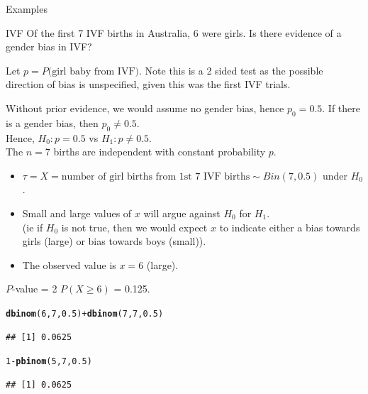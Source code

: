 \documentclass[t,xcolor=pdftex,dvipsnames,table]{beamer}
\makeatletter
\newcommand{\hlnum}[1]{\textcolor[rgb]{0.686,0.059,0.569}{#1}}%
\newcommand{\hlopt}[1]{\textcolor[rgb]{0,0,0}{#1}}%
\newcommand{\hlstd}[1]{\textcolor[rgb]{0.345,0.345,0.345}{#1}}%
\newcommand{\hlkwd}[1]{\textcolor[rgb]{0.737,0.353,0.396}{\textbf{#1}}}%
\newenvironment{kframe}{%
 \def\at@end@of@kframe{}%
 \ifinner\ifhmode%
  \def\at@end@of@kframe{\end{minipage}}%
  \begin{minipage}{\columnwidth}%
 \fi\fi%
 \def\FrameCommand##1{\hskip\@totalleftmargin \hskip-\fboxsep
 \colorbox{shadecolor}{##1}\hskip-\fboxsep
     \hskip-\linewidth \hskip-\@totalleftmargin \hskip\columnwidth}%
 \MakeFramed {\advance\hsize-\width
   \@totalleftmargin\z@ \linewidth\hsize
   \@setminipage}}%
 {\par\unskip\endMakeFramed%
 \at@end@of@kframe}
\newenvironment{knitrout}{}{} %
\makeatother
\begin{document}
\begin{frame}{Examples}
\begin{block}{IVF}
Of the first 7 IVF births in Australia, 6 were girls. Is there evidence of a gender bias in IVF?
\end{block}

\vspace{.5cm}
Let $p = P(\mbox{girl baby from IVF)}$. Note this is a 2 sided test as the possible direction of bias is unspecified, given this was the first IVF trials.

\vspace{.5cm}
Without prior evidence, we would assume no gender bias, hence $p_{0} = 0.5$. If there is a gender bias, then $p_{0} \neq 0.5$.  \\
Hence,  $H_{0}: p = 0.5$ vs $H_{1}: p \neq 0.5$. \\

\vspace{.5cm}
 The $n=7$ births are independent with constant probability $p$.

\end{frame}


\begin{frame}[fragile]{}

\begin{itemize}
\item $\tau = X =  \mbox{number of girl births from 1st 7 IVF births} \sim Bin(7,0.5)$ under $H_{0}$. 
\item Small and large values of $x$ will argue against $H_{0}$ for $H_{1}$. \\
(ie if $H_{0}$ is not true, then we would expect $x$ to indicate either a bias towards girls (large) or bias towards boys (small)).
\item The observed value is $x=6$ (large).
\end{itemize}

\vspace{.5cm}
 $P$-value = 2 $P( X \geq 6)$ = 0.125.

\begin{knitrout}
\color{fgcolor}\begin{kframe}
\begin{alltt}
\hlkwd{dbinom}\hlstd{(}\hlnum{6}\hlstd{,}\hlnum{7}\hlstd{,}\hlnum{0.5}\hlstd{)} \hlopt{+} \hlkwd{dbinom}\hlstd{(}\hlnum{7}\hlstd{,}\hlnum{7}\hlstd{,}\hlnum{0.5}\hlstd{)}
\end{alltt}
\begin{verbatim}
## [1] 0.0625
\end{verbatim}
\begin{alltt}
\hlnum{1}\hlopt{-}\hlkwd{pbinom}\hlstd{(}\hlnum{5}\hlstd{,}\hlnum{7}\hlstd{,}\hlnum{0.5}\hlstd{)}
\end{alltt}
\begin{verbatim}
## [1] 0.0625
\end{verbatim}
\end{kframe}
\end{knitrout}
\end{frame}
\end{document}
